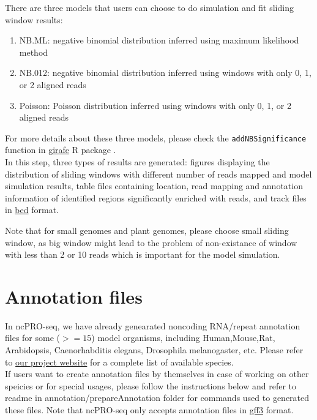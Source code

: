 \documentclass[12pt]{article}
\def \ncpip{ncPRO-seq}
\begin{document}
There are three models that users can choose to do simulation and fit sliding window results: 
\begin{enumerate}
 \item NB.ML: negative binomial distribution inferred using maximum likelihood method
 \item NB.012: negative binomial distribution inferred using windows with only 0, 1, or 2 aligned reads
 \item Poisson: Poisson distribution inferred using windows with only 0, 1, or 2 aligned reads
\end{enumerate}

For more details about these three models, please check the \verb+addNBSignificance+ function in \href{http://www.bioconductor.org/packages/2.6/bioc/html/girafe.html}{ girafe} R package \cite{Joern2010}.\\

In this step, three types of results are generated: figures displaying the distribution of sliding windows with different number of reads mapped and model simulation results, table files containing location, read mapping and annotation information of identified regions significantly enriched with reads, and track files in \href{http://genome.ucsc.edu/FAQ/FAQformat.html#format1}{bed} format.

Note that for small genomes and plant genomes, please choose small sliding window, as big window might lead to the problem of non-existance of window with less than 2 or 10 reads which is important for the model simulation.

\section{Annotation files}

In \ncpip{}, we have already genearated noncoding RNA/repeat annotation files for some ($>=15$) model organisms, including Human,Mouse,Rat, Arabidopsis, Caenorhabditis elegans, Drosophila melanogaster, etc. Please refer to \href{http://ncproseq.sourceforge.net/download.html}{ our project website} for a complete list of available species. \\If users want to create annotation files by themselves in case of working on other speicies or for special usages, please follow the instructions below and refer to readme in annotation/prepareAnnotation folder for commands used to generated these files. Note that \ncpip{} only accepts annotation files in \href{http://gmod.org/wiki/GFF#GFF3}{ gff3} format. 
\end{document}
